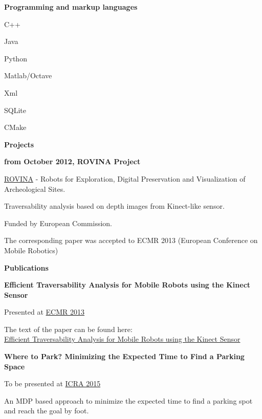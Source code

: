 \documentclass[a4paper,12pt,final]{memoir}
\newcommand{\SmallSep}{\vspace{0.5em}}
\newcommand{\CVSection}[1]
	{\Large\textbf{#1}\par
	\SmallSep\normalsize\normalfont}
\newcommand{\CVItem}[1]
	{\textbf{\color{MidnightBlue} #1}}
\begin{document}
\CVItem{Programming and markup languages}
\begin{multicols}{3}
\begin{compactitem}[\color{MidnightBlue}$\circ$]
	\item C++
	\item Java
	\item Python
	\item Matlab/Octave
	\item Xml
	\item SQLite
	\item CMake
\end{compactitem}
\end{multicols}
\SmallSep

\CVSection{Projects}
\CVItem{from October 2012, ROVINA Project}
\begin{compactitem}[\color{MidnightBlue}$\circ$]
	\item \href{http://www.rovina-project.eu/}{ROVINA}  - Robots for Exploration, Digital Preservation and Visualization of Archeological Sites.
	\item Traversability analysis based on depth images from Kinect-like sensor.
	\item Funded by European Commission.
	\item The corresponding paper was accepted to ECMR 2013 (European Conference on Mobile Robotics)
\end{compactitem}
\SmallSep

\CVSection{Publications}
\CVItem{Efficient Traversability Analysis for Mobile Robots using the Kinect Sensor}
\begin{compactitem}[\color{MidnightBlue}$\circ$]
	\item Presented at \href{http://www.iri.upc.edu/ecmr13/#home}{ECMR 2013}
	\item The text of the paper can be found here: \\\href{http://www.informatik.uni-freiburg.de/~stachnis/pdf/bogoslavskyi13ecmr.pdf}{Efficient Traversability Analysis for Mobile Robots using the Kinect Sensor}
\end{compactitem}
\CVItem{Where to Park? Minimizing the Expected Time to Find a Parking Space}
\begin{compactitem}[\color{MidnightBlue}$\circ$]
	\item To be presented at \href{http://icra2015.org/}{ICRA 2015}
	\item An MDP based approach to minimize the expected time to find a parking spot and reach the goal by foot.
\end{compactitem}
\SmallSep
\end{document}
